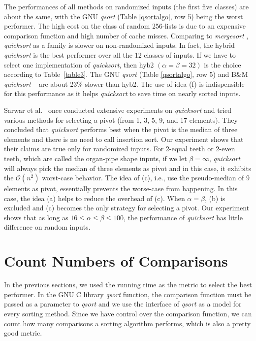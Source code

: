 \documentclass[AMA,STIX1COL]{WileyNJD-v2}
\newcommand{\qusort}{\emph{quicksort }}
\newcommand{\qusortn}{\emph{quicksort}}
\newcommand{\qsort}{\emph{qsort }}
\newcommand{\msort}{\emph{mergesort }}
\begin{document}
The performances of all methods on randomized inputs (the first five classes) are about the same, with the GNU \qsort (Table \ref{qsortalgo}, row 5) being the worst performer. 
The high cost on the class of random 256-lists is due to an expensive comparison function and high number of cache misses. 
Comparing to \msort, \qusort as a family is slower on non-randomized inputs. 
In fact, the hybrid \qusort is the best performer over all the 12 classes of inputs. 
If we have to select one implementation of \qusortn, then hyb2 $(\alpha = \beta = 32)$ is the choice according to Table~\ref{table3}. 
The GNU \qsort (Table \ref{qsortalgo}, row 5) and B\&M \qusort~\cite{bentley1993engineering} are about 23\% slower than hyb2. 
The use of idea (f) is indispensible for this performance as it helps \qusort to save time on nearly sorted inputs. 

Sarwar et al.~\cite{sarwar1996engineering} once conducted extensive experiments on \qusort and tried various methods for selecting a pivot (from 1, 3, 5, 9, and 17 elements). 
They concluded that \qusort performs best when the pivot is the median of three elements and there is no need to call insertion sort. 
Our experiment shows that their claims are true only for randomized inputs. 
For 2-equal teeth or 2-even teeth, which are called the organ-pipe shape inputs, if we let $\beta = \infty$, \qusort will always pick the median of three elements as pivot and in this case, it exhibits the $\mathcal{O}(n^2)$ worst-case behavior. 
The idea of (c), i.e., use the pseudo-median of 9 elements as pivot, essentially prevents the worse-case from happening. 
In this case, the idea (a) helps to reduce the overhead of (c). When $\alpha = \beta$, (b) is excluded and (c) becomes the only strategy for selecting a pivot. 
Our experiment shows that as long as $16 \leq \alpha \leq \beta \leq 100$, the performance of \qusort has little difference on random inputs.

\section{Count Numbers of Comparisons} 
In the previous sections, we used the running time as the metric to select the best performer. 
In the GNU C library \qsort function, the comparison function must be passed as a parameter to \qsort and we use the interface of \qsort as a model for every sorting method. 
Since we have control over the comparison function, we can count how many comparisons a sorting algorithm performs, which is also a pretty good metric.
\end{document}
